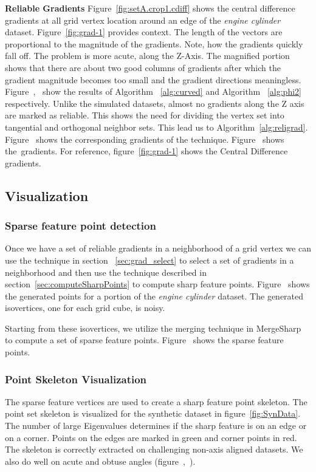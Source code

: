 \textbf{Reliable Gradients} 
Figure~\ref{fig:setA.crop1.cdiff} shows the central difference gradients at all grid vertex location around an edge of the \textit{engine cylinder} dataset.
Figure~\ref{fig:grad-1} provides context. The length of the vectors are proportional to the magnitude of the gradients. Note, how the gradients quickly fall off. The problem is more acute, along the Z-Axis. 
The magnified portion shows that there are about two good columns of gradients after which the gradient magnitude becomes too small and the gradient directions meaningless. 
Figure~,~ show the results of Algorithm ~\ref{alg:curved} and Algorithm ~\ref{alg:phi2} respectively. Unlike the simulated datasets, almost no gradients along the Z axis are marked as reliable. This shows the need for dividing the vertex set into tangential and orthogonal neighbor sets. This lead us to Algorithm~\ref{alg:religrad}. Figure~ shows the corresponding gradients of the \FindReliable technique. Figure~ shows the~\ReliGrad gradients. For reference, figure~\ref{fig:grad-1} shows the Central Difference gradients. 
  
\subsection{Visualization}
\subsubsection{Sparse feature point detection}
\label{sec:sparsePointExtraction}
Once we have a set of reliable gradients in a neighborhood of a grid vertex we can use the technique in section ~\ref{sec:grad_select} to select a set of gradients in a neighborhood and then use the technique described in section~\ref{sec:computeSharpPoints} to compute sharp feature points. Figure~ shows the generated points for a portion of the \textit{ engine cylinder} dataset. 
The generated isovertices, one for each grid cube, is  noisy.

Starting from these isovertices, we utilize the merging technique in MergeSharp~\cite{bw-cisec-13} to compute a set of sparse feature points. Figure~ shows the sparse feature points.

\subsubsection{Point Skeleton Visualization}
The sparse feature vertices are used to create a sharp feature point skeleton. The point set skeleton is visualized for the synthetic dataset in figure~\ref{fig:SynData}. The number of large Eigenvalues determines if the sharp feature is on an edge or on a corner. Points on the edges are marked in green and corner points in red.
The skeleton is correctly extracted on challenging non-axis aligned datasets. We also do well on  acute and obtuse angles (figure~,~).

